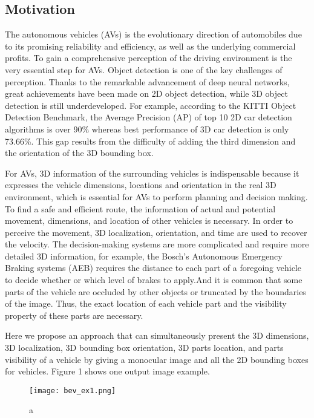 \subsection{Motivation}
The autonomous vehicles (AVs) is the evolutionary direction of automobiles  due to its promising reliability and efficiency, as well as the underlying commercial profits. To gain a comprehensive perception of the driving environment is the very essential step for AVs. Object detection is one of the key challenges of perception. Thanks to the remarkable advancement of deep neural networks, great achievements have been made on 2D object detection, while 3D object detection is still underdeveloped. For example, according to the  KITTI Object Detection Benchmark\cite{Geiger2012CVPR}, the Average Precision (AP) of  top 10 2D car detection algorithms is over 90\% whereas best performance of 3D car detection is only 73.66\%. This gap results from the difficulty of adding the third dimension and the orientation of the 3D bounding box.

For AVs, 3D information of the surrounding vehicles is indispensable because it expresses the vehicle dimensions, locations and orientation in the real 3D environment, which is essential for AVs to perform planning and decision making. To find a safe and efficient route, the information of actual and potential movement, dimensions, and location of other vehicles is necessary. In order to perceive the movement, 3D localization,  orientation, and time are used to recover the velocity. The decision-making systems are more complicated and require more detailed 3D information, for example, the Bosch's Autonomous Emergency Braking systems (AEB) requires the distance to each part of a foregoing vehicle to decide whether or which level of brakes to apply.And it is common that some parts of the vehicle are occluded by other objects or truncated by the boundaries of the image. Thus, the exact location of each vehicle part and the visibility property of these parts are necessary.

Here we propose an approach that can simultaneously present the 3D dimensions, 3D localization, 3D bounding box orientation, 3D parts location, and parts visibility of a vehicle by giving a monocular image and all the 2D bounding boxes for vehicles. Figure 1 \tbd shows one output image example.

\begin{figure}[h]		
	\texttt{[image: bev\_ex1.png]}
	\caption{a}
	\centering
	\label{figure:a}
\end{figure}


